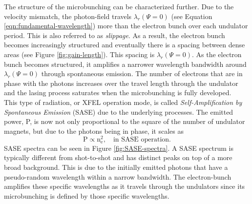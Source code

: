 %
The structure of the microbunching can be characterized further. Due to the velocity mismatch, the photon-field travels $\lambda_{r}(\Psi = 0)$ (see Equation \ref{eqn:fundamental-wavelength}) more than the electron bunch over each undulator period. This is also referred to as \textit{slippage}. As a result, the electron bunch becomes increasingly structured and eventually there is a spacing between dense areas (see Figure \ref{fig:gain-length}). This spacing is $\lambda_{r}(\Psi = 0)$. As the electron bunch becomes structured, it amplifies a narrower wavelength bandwidth around $\lambda_{r}(\Psi = 0)$ through spontaneous emission. The number of electrons that are in phase with the photons increases over the travel length through the undulator and the lasing process saturates when the microbunching is fully developed.\\[1\baselineskip]
%
This type of radiation, or XFEL operation mode, is called \textit{Self-Amplification by Spontaneous Emission} (SASE) due to the underlying processes. The emitted power, P, is now not only proportional to the square  of the number of undulator magnets, but due to the photons being in phase, it scales as \citep{Als-Nielson-2011-JWS}
\begin{equation}
\text{P} \propto \text{n}_{\text{e}}^{2},\quad \text{in SASE operation.}
\end{equation}
SASE spectra can be seen in Figure \ref{fig:SASE-spectra}. A SASE spectrum is typically different from shot-to-shot and has distinct peaks on top of a more broad background. This is due to the initially emitted photons that have a pseudo-random wavelength within a narrow bandwidth. The electron-bunch amplifies these specific wavelengths as it travels through the undulators since its microbunching is defined by those specific wavelengths.\\[1\baselineskip]
